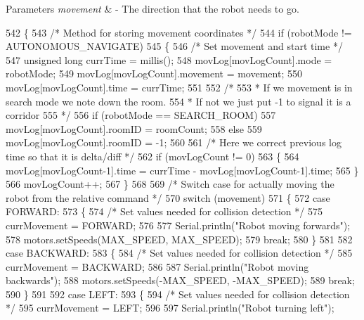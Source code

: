 \begin{DoxyParams}{Parameters}
{\em movement} & -\/ The direction that the robot needs to go. \\
\hline
\end{DoxyParams}

\begin{DoxyCode}
542 \{
543   \textcolor{comment}{/* Method for storing movement coordinates */}
544   \textcolor{keywordflow}{if} (robotMode != AUTONOMOUS\_NAVIGATE)
545   \{
546     \textcolor{comment}{/* Set movement and start time */}
547     \textcolor{keywordtype}{unsigned} \textcolor{keywordtype}{long} currTime = millis();
548     movLog[movLogCount].mode = robotMode;
549     movLog[movLogCount].movement = movement;
550     movLog[movLogCount].time = currTime;
551 
552     \textcolor{comment}{/*}
553 \textcolor{comment}{     * If we movement is in search mode we note down the room.}
554 \textcolor{comment}{     * If not we just put -1 to signal it is a corridor}
555 \textcolor{comment}{     */}
556     \textcolor{keywordflow}{if} (robotMode == SEARCH\_ROOM)
557       movLog[movLogCount].roomID = roomCount;
558     \textcolor{keywordflow}{else}
559       movLog[movLogCount].roomID = -1;
560 
561     \textcolor{comment}{/* Here we correct previous log time so that it is delta/diff */}
562     \textcolor{keywordflow}{if} (movLogCount != 0)
563     \{
564       movLog[movLogCount-1].time = currTime - movLog[movLogCount-1].time;
565     \}
566     movLogCount++;
567   \}
568 
569   \textcolor{comment}{/* Switch case for actually moving the robot from the relative command */}
570   \textcolor{keywordflow}{switch} (movement)
571   \{
572     \textcolor{keywordflow}{case} FORWARD:
573     \{
574       \textcolor{comment}{/* Set values needed for collision detection */}
575       currMovement = FORWARD;
576 
577       Serial.println(\textcolor{stringliteral}{"Robot moving forwards"});
578       motors.setSpeeds(MAX\_SPEED, MAX\_SPEED);
579       \textcolor{keywordflow}{break};
580     \}
581 
582     \textcolor{keywordflow}{case} BACKWARD:
583     \{
584       \textcolor{comment}{/* Set values needed for collision detection */}
585       currMovement = BACKWARD;
586 
587       Serial.println(\textcolor{stringliteral}{"Robot moving backwards"});
588       motors.setSpeeds(-MAX\_SPEED, -MAX\_SPEED);
589       \textcolor{keywordflow}{break};
590     \}
591 
592     \textcolor{keywordflow}{case} LEFT:
593     \{
594       \textcolor{comment}{/* Set values needed for collision detection */}
595       currMovement = LEFT;
596 
597       Serial.println(\textcolor{stringliteral}{"Robot turning left"});

\end{DoxyCode}
